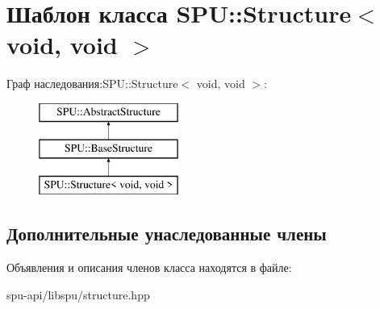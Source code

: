 \hypertarget{class_s_p_u_1_1_structure_3_01void_00_01void_01_4}{}\section{Шаблон класса S\+PU\+:\+:Structure$<$ void, void $>$}
\label{class_s_p_u_1_1_structure_3_01void_00_01void_01_4}
Граф наследования\+:S\+PU\+:\+:Structure$<$ void, void $>$\+:\begin{figure}[H]
\begin{center}
\leavevmode
\includegraphics[height=3.000000cm]{class_s_p_u_1_1_structure_3_01void_00_01void_01_4}
\end{center}
\end{figure}
\subsection*{Дополнительные унаследованные члены}


Объявления и описания членов класса находятся в файле\+:\begin{DoxyCompactItemize}
\item 
spu-\/api/libspu/structure.\+hpp\end{DoxyCompactItemize}
